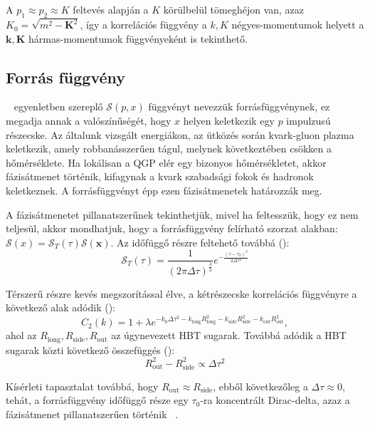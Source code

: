 \documentclass[10pt,a4paper]{article}
\numberwithin{equation}{subsection}
\numberwithin{figure}{section}
\begin{document}
A $p_1\approx p_2\approx K$ feltevés alapján a $K$ körülbelül tömeghéjon van, azaz $K_0 = \sqrt{m^2-\bm{K}^2}$, így a korrelációs függvény a $k,K$ négyes-momentumok helyett a $\bm{k},\bm{K}$ hármas-momentumok függvényeként is tekinthető.

\subsection{Forrás függvény}
~ egyenletben szereplő $\mathcal{S}({p},{x})$ függvényt nevezzük forrásfüggvénynek, ez megadja annak a valószínűségét, hogy ${x}$ helyen keletkezik egy ${p}$ impulzusú részecske. Az általunk vizsgált energiákon, az ütközés során kvark-gluon plazma keletkezik, amely robbanásszerűen tágul, melynek következtében csökken a hőmérséklete. Ha lokálisan a QGP elér egy bizonyos hőmérsékletet, akkor fázisátmenet történik, kifagynak a kvark szabadsági fokok és hadronok keletkeznek. A forrásfüggvényt épp ezen fázisátmenetek határozzák meg. 

A fázisátmenetet pillanatszerűnek tekinthetjük, mivel ha feltesszük, hogy ez nem teljesül, akkor mondhatjuk, hogy a forrásfüggvény felírható szorzat alakban: $\mathcal{S}({x}) = \mathcal{S}_T(\tau)\mathcal{S}(\bm{x})$. Az időfüggő részre feltehető továbbá (\cite{CsanadHabil}):
\begin{equation}
\mathcal{S}_T(\tau)=\frac{1}{(2\pi \Delta\tau)^\frac{3}{2}}e^{-\frac{(\tau-\tau_0)^2}{2\Delta\tau^2}}
\end{equation}

Térszerű részre kevés megszorítással élve, a kétrészecske korrelációs függvényre a következő alak adódik (\cite{CsanadHabil}):
\begin{equation}
C_2(k)=1+\lambda e^{-k_0\Delta\tau^2-k_{\mathrm{long}}R_{\mathrm{long}}^2-k_{\mathrm{side}}R_{\mathrm{side}}^2-k_{\mathrm{out}}R_{\mathrm{out}}^2},
\end{equation}
ahol az $R_{\mathrm{long}},R_{\mathrm{side}},R_{\mathrm{out}}$ az úgynevezett HBT sugarak. Továbbá adódik a HBT sugarak közti következő összefüggés (\cite{CsanadHabil}):
\begin{equation}
R_{\mathrm{out}}^2-R_{\mathrm{side}}^2\propto \Delta\tau^2
\end{equation}

Kísérleti tapasztalat továbbá, hogy $R_{\mathrm{out}}\approx R_{\mathrm{side}}$, ebből következőleg a $\Delta\tau\approx 0$, tehát, a  forrásfüggvény időfüggő része egy $\tau_0$-ra koncentrált Dirac-delta, azaz a fázisátmenet pillanatszerűen történik ~\cite{Ster:2010ia, Csorgo:1999sj, Csanad:2009wc}.
\end{document}
